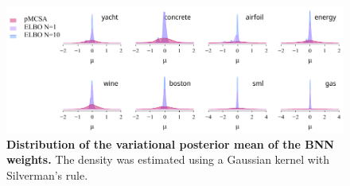\newpage
\begin{figure}[H]
  \vspace{-0.10in}
  \centering
  \includegraphics[scale=0.9]{figures/pruning_02.pdf}
  \vspace{-0.05in}
  \caption{\textbf{
      Distribution of the variational posterior mean of the BNN weights.
    }
    The density was estimated using a Gaussian kernel with Silverman's rule.
  }\label{fig:pruning_additional}
\end{figure}

